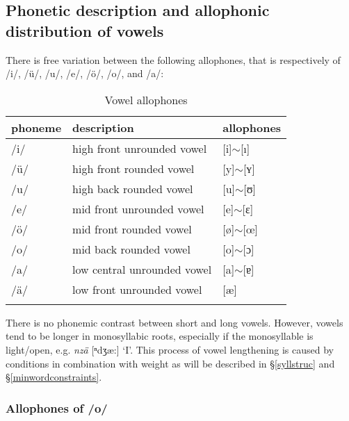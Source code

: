 \subsection{Phonetic description and allophonic distribution of vowels} \label{phonetic-description-vowels}

There is free variation between the following allophones, that is respectively of /i/, /ü/, /u/, /e/, /ö/, /o/, and /a/:

\begin{table}
\caption{Vowel allophones}
\label{allovowel}
	\begin{tabular}{ll@{~~$\rightarrow$~~}l}
		\lsptoprule
		phoneme&description&allophones\\\midrule
		/i/ &high front unrounded vowel & [i]$\sim$[ı]\\
		/ü/ &high front rounded vowel & [y]$\sim$[ʏ]\\
		/u/ &high back rounded vowel & [u]$\sim$[ʊ]\\
		/e/ &mid front unrounded vowel & [e]$\sim$[ɛ]\\
		/ö/ &mid front rounded vowel & [ø]$\sim$[œ]\\
		/o/ &mid back rounded vowel & [o]$\sim$[ɔ]\\
		/a/ &low central unrounded vowel & [a]$\sim$[ɐ]\\
		/ä/ &low front unrounded vowel & [æ]\\
		\lspbottomrule
	\end{tabular}
\end{table}%

There is no phonemic contrast between short and long vowels. However, vowels tend to be longer in monosyllabic roots, especially if the monosyllable is light/open, e.g. \emph{nzä} [ⁿdʒæ:] `I'. This process of vowel lengthening is caused by  conditions in combination with  weight as will be described in \S{}\ref{syllstruc} and \S{}\ref{minwordconstraints}.

\subsubsection{Allophones of /o/}\label{allo-o}

